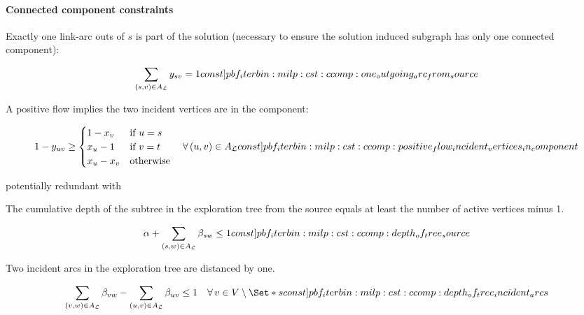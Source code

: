 \paragraph{Connected component constraints}

Exactly one link-arc outs of \(s\) is part of the solution (necessary to ensure the solution induced subgraph has only one connected component):
\begin{Constraint}
  \begin{equation}
    \sum_{(s, v) \in A_\Links{}} y_{sv} = 1 \cstlabel{pbf_iterbin:milp:cst:ccomp:one_outgoing_arc_from_source} %
  \end{equation}
\end{Constraint}

A positive flow implies the two incident vertices are in the component:
\begin{Constraint}
  \begin{equation}
    1 - y_{uv} \geq
    \begin{cases}
      1 - x_v & \text{if \(u = s\)} \\
      x_u - 1 & \text{if \(v = t\)} \\
      x_u - x_v & \text{otherwise}
    \end{cases}
    \quad \forall (u, v) \in A_\Links{}
    \cstlabel{pbf_iterbin:milp:cst:ccomp:positive_flow_incident_vertices_in_component} %
  \end{equation}
\end{Constraint}
%
\begin{questionbox}
  potentially redundant with 
\end{questionbox}

The cumulative depth of the subtree in the exploration tree from the source equals at least the number of active vertices minus 1.
\begin{Constraint}
  \begin{align}
    \alpha + \sum_{(s, w) \in A_\Links{}} \beta_{sw} \leq 1 \cstlabel{pbf_iterbin:milp:cst:ccomp:depth_of_tree_source} %
  \end{align}
\end{Constraint}

Two incident arcs in the exploration tree are distanced by one.
\begin{Constraint}
  \begin{align}
    \sum_{(v, w) \in A_\Links{}} \beta_{vw} - \sum_{(u, v) \in A_\Links{}} \beta_{uv} \leq 1 \quad \forall v \in V \setminus \Set*{s}
    \cstlabel{pbf_iterbin:milp:cst:ccomp:depth_of_tree_incident_arcs} %
  \end{align}
\end{Constraint}


